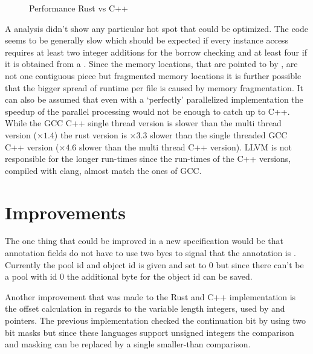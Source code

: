 \documentclass[thesis]{subfiles}
\begin{document}
  \begin{figure}[ht]
    \centering
    

    \hspace*{.55em}
    \hfill
    

    
    \caption{Performance Rust vs C++}\label{fig:bench}
  \end{figure}

  A  analysis didn't show any particular hot spot that could be optimized.
  The code seems to be generally slow which should be expected if every \PtrT instance access requires at least two integer additions for the borrow checking and at least four if it is obtained from a \UserTypePool.
  Since the memory locations, that are pointed to by \PtrT, are not one contiguous piece but fragmented memory locations it is further possible that the bigger spread of runtime per file is caused by memory fragmentation.
  It can also be assumed that even with a `perfectly' parallelized implementation the speedup of the parallel processing would not be enough to catch up to C++.
  While the GCC C++ single thread version is slower than the multi thread version ($\times 1.4$) the rust version is $\times 3.3$ slower than the single threaded GCC C++ version ($\times 4.6$ slower than the multi thread C++ version).
  LLVM is not responsible for the longer run-times since the run-times of the C++ versions, compiled with clang, almost match the ones of GCC.

\section{ Improvements}
  The one thing that could be improved in a new specification would be that annotation fields do not have to use two byes to signal that the annotation is .
  Currently the pool id and object id is given and set to 0 but since there can't be a pool with id 0 the additional byte for the object id can be saved.

  Another improvement that was made to the Rust and C++ implementation is the offset calculation in regards to the variable length integers, used by  and pointers.
  The previous implementation checked the continuation bit by using two bit masks but since these languages support unsigned integers the comparison and masking can be replaced by a single smaller-than comparison.
\end{document}
